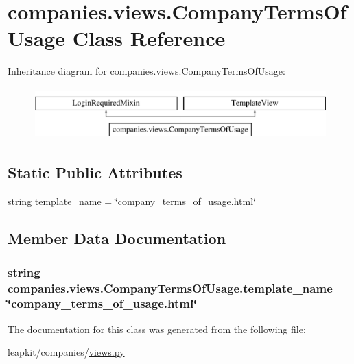 \hypertarget{classcompanies_1_1views_1_1_company_terms_of_usage}{\section{companies.\-views.\-Company\-Terms\-Of\-Usage Class Reference}
\label{classcompanies_1_1views_1_1_company_terms_of_usage}
}
Inheritance diagram for companies.\-views.\-Company\-Terms\-Of\-Usage\-:\begin{figure}[H]
\begin{center}
\leavevmode
\includegraphics[height=2.000000cm]{classcompanies_1_1views_1_1_company_terms_of_usage}
\end{center}
\end{figure}
\subsection*{Static Public Attributes}
\begin{DoxyCompactItemize}
\item 
string \hyperlink{classcompanies_1_1views_1_1_company_terms_of_usage_a6900851cc1b4c432a16b39cc0061ad4a}{template\-\_\-name} = \char`\"{}company\-\_\-terms\-\_\-of\-\_\-usage.\-html\char`\"{}
\end{DoxyCompactItemize}


\subsection{Member Data Documentation}
\hypertarget{classcompanies_1_1views_1_1_company_terms_of_usage_a6900851cc1b4c432a16b39cc0061ad4a}{
\subsubsection[{template\-\_\-name}]{\setlength{\rightskip}{0pt plus 5cm}string companies.\-views.\-Company\-Terms\-Of\-Usage.\-template\-\_\-name = \char`\"{}company\-\_\-terms\-\_\-of\-\_\-usage.\-html\char`\"{}\hspace{0.3cm}{\ttfamily [static]}}}\label{classcompanies_1_1views_1_1_company_terms_of_usage_a6900851cc1b4c432a16b39cc0061ad4a}


The documentation for this class was generated from the following file\-:\begin{DoxyCompactItemize}
\item 
leapkit/companies/\hyperlink{companies_2views_8py}{views.\-py}\end{DoxyCompactItemize}
